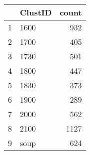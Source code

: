 \begin{table}[ht]
\centering
\begin{tabular}{rlr}
  \hline
 & ClustID & count \\ 
  \hline
1 & 1600 & 932 \\ 
  2 & 1700 & 405 \\ 
  3 & 1730 & 501 \\ 
  4 & 1800 & 447 \\ 
  5 & 1830 & 373 \\ 
  6 & 1900 & 289 \\ 
  7 & 2000 & 562 \\ 
  8 & 2100 & 1127 \\ 
  9 & soup & 624 \\ 
   \hline
\end{tabular}
\end{table}
